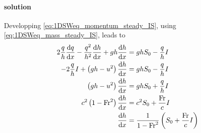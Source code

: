 \paragraph{solution} 
Developping \eqref{eq:1DSWeq_momentum_steady_IS}, using \eqref{eq:1DSWeq_mass_steady_IS}, leads to
\begin{align}
\displaystyle{2\frac{q}{h}\frac{\mathrm{d}q}{\mathrm{d}x} - \frac{q^2}{h^2}\frac{\mathrm{d}h}{\mathrm{d}x}+gh\frac{\mathrm{d}h}{\mathrm{d}x}} & = ghS_0  - \displaystyle{\frac{q}{h}} I \nonumber\\
\displaystyle{-2\frac{q}{h}I + \left(gh - u^2\right)\frac{\mathrm{d}h}{\mathrm{d}x}}& = ghS_0  - \displaystyle{\frac{q}{h}} I\nonumber\\
\displaystyle{\left(gh - u^2\right)\frac{\mathrm{d}h}{\mathrm{d}x}}& = ghS_0 + \displaystyle{\frac{q}{h}I}\nonumber\\
\displaystyle{c^2\left(1 - \mathrm{Fr}^2\right)\frac{\mathrm{d}h}{\mathrm{d}x}}& = c^2S_0 + \displaystyle{\frac{\mathrm{Fr}}{c}I}\nonumber\\
\displaystyle{\frac{\mathrm{d}h}{\mathrm{d}x}}& = \displaystyle{\frac{1}{1 - \mathrm{Fr}^2}}\left(S_0 + \displaystyle{\frac{\mathrm{Fr}}{c}I}\right) \label{eq:1DSWeq_momentum_steady_IS_ODE}
\end{align}